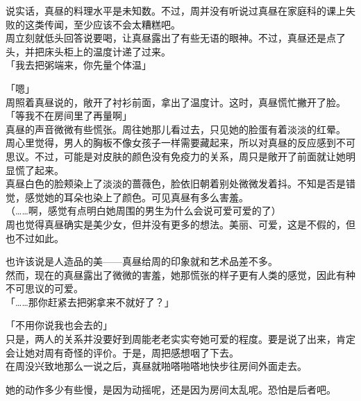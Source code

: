 说实话，真昼的料理水平是未知数。不过，周并没有听说过真昼在家庭科的课上失败的这类传闻，至少应该不会太糟糕吧。\\

周立刻就低头回答说要喝，让真昼露出了有些无语的眼神。不过，真昼还是点了头，并把床头柜上的温度计递了过来。\\

「我去把粥端来，你先量个体温」

「嗯」\\

周照着真昼说的，敞开了衬衫前面，拿出了温度计。这时，真昼慌忙撇开了脸。\\

「等我不在房间里了再量啊」\\

真昼的声音微微有些慌张。周往她那儿看过去，只见她的脸蛋有着淡淡的红晕。\\

周心里觉得，男人的胸板不像女孩子一样需要藏起来，所以对真昼的反应感到不可思议。不过，可能是对皮肤的颜色没有免疫力的关系，周只是敞开了前面就让她明显慌了起来。\\

真昼白色的脸颊染上了淡淡的蔷薇色，脸依旧朝着别处微微发着抖。不知是否是错觉，感觉她的耳朵也染上了颜色。可见真昼有多么害羞。\\

（……啊，感觉有点明白她周围的男生为什么会说可爱可爱的了）\\

周也觉得真昼确实是美少女，但并没有更多的想法。美丽、可爱，这是不假的，但也不过如此。

也许该说是人造品的美——真昼给周的印象就和艺术品差不多。\\

然而，现在的真昼露出了微微的害羞，她那慌张的样子更有人类的感觉，因此有种不可思议的可爱。\\

「……那你赶紧去把粥拿来不就好了？」

「不用你说我也会去的」\\

只是，两人的关系并没要好到周能老老实实夸她可爱的程度。要是说了出来，肯定会让她对周有奇怪的评价。于是，周把感想咽了下去。\\

在周没兴致地那么一说之后，真昼就啪嗒啪嗒地快步往房间外面走去。

她的动作多少有些慢，是因为动摇呢，还是因为房间太乱呢。恐怕是后者吧。\\

